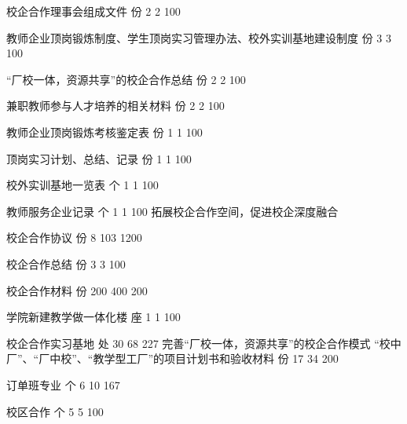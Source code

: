 校企合作理事会组成文件
份
2
2
100%

教师企业顶岗锻炼制度、学生顶岗实习管理办法、校外实训基地建设制度
份
3
3
100%

“厂校一体，资源共享”的校企合作总结
份
2
2
100%

兼职教师参与人才培养的相关材料
份
2
2
100%

教师企业顶岗锻炼考核鉴定表
份
1
1
100%

顶岗实习计划、总结、记录
份
1
1
100%

校外实训基地一览表
个
1
1
100%

教师服务企业记录
个
1
1
100%
拓展校企合作空间，促进校企深度融合

校企合作协议
份
8
103
1200%

校企合作总结
份
3
3
100%

校企合作材料
份
200
400
200%

学院新建教学做一体化楼
座
1
1
100%

校企合作实习基地
处
30
68
227%
完善“厂校一体，资源共享”的校企合作模式
“校中厂”、“厂中校”、“教学型工厂”的项目计划书和验收材料
份
17
34
200%

订单班专业
个
6
10
167%

校区合作
个
5
5
100%

